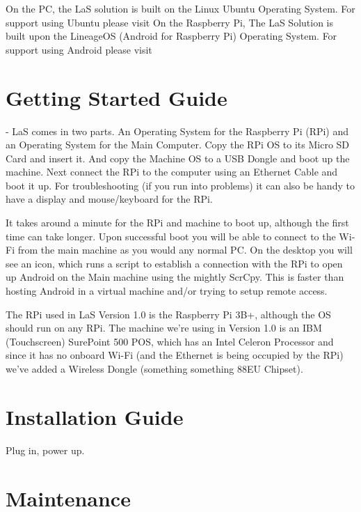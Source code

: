 \documentclass[letterpaper,10pt,openany,oneside,english]{sphinxmanual}
\begin{document}
On the PC, the LaS solution is built on the Linux Ubuntu Operating System. For support using Ubuntu please visit 
On the Raspberry Pi, The LaS Solution is built upon the LineageOS (Android for Raspberry Pi) Operating System. For support using Android please visit 


\section{Getting Started Guide}
\label{\detokenize{gettingstarted:getting-started-guide}}\label{\detokenize{gettingstarted::doc}}
 - LaS comes in two parts. An Operating System for the Raspberry Pi (RPi) and an Operating System for the Main Computer. Copy the RPi OS to its Micro SD Card and insert it. And copy the Machine OS to a USB Dongle and boot up the machine. Next connect the RPi to the computer using an Ethernet Cable and boot it up. For troubleshooting (if you run into problems) it can also be handy to have a display and mouse/keyboard for the RPi.

It takes around a minute for the RPi and machine to boot up, although the first time can take longer. Upon successful boot you will be able to connect to the Wi-Fi from the main machine as you would any normal PC. On the desktop you will see an icon, which runs a script to establish a connection with the RPi to open up Android on the Main machine using the mightly ScrCpy. This is faster than hosting Android in a virtual machine and/or trying to setup remote access.

 The RPi used in LaS Version 1.0 is the Raspberry Pi 3B+, although the OS should run on any RPi. The machine we’re using in Version 1.0 is an IBM (Touchscreen) SurePoint 500 POS, which has an Intel Celeron Processor and since it has no onboard Wi-Fi (and the Ethernet is being occupied by the RPi) we’ve added a Wireless Dongle (something something 88EU Chipset).


\section{Installation Guide}
\label{\detokenize{installation:installation-guide}}\label{\detokenize{installation::doc}}
Plug in, power up.


\section{Maintenance}
\label{\detokenize{productmaint:maintenance}}\label{\detokenize{productmaint::doc}}
\end{document}
